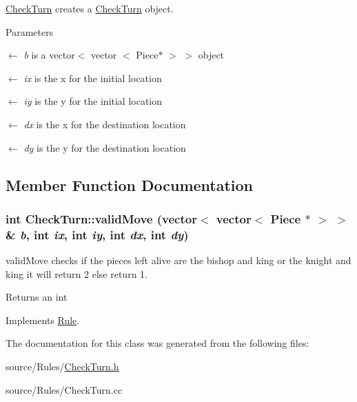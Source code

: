 \hyperlink{classCheckTurn}{CheckTurn} creates a \hyperlink{classCheckTurn}{CheckTurn} object. 
\begin{DoxyParams}{Parameters}
\item[\mbox{$\leftarrow$} {\em b}]is a vector$<$ vector $<$ Piece$\ast$ $>$ $>$ object \item[\mbox{$\leftarrow$} {\em ix}]is the x for the initial location \item[\mbox{$\leftarrow$} {\em iy}]is the y for the initial location \item[\mbox{$\leftarrow$} {\em dx}]is the x for the destination location \item[\mbox{$\leftarrow$} {\em dy}]is the y for the destination location \end{DoxyParams}


\subsection{Member Function Documentation}
\hypertarget{classCheckTurn_acb5d45e0ee242eb4af3dc6a7437b39e5}{
\subsubsection[{validMove}]{\setlength{\rightskip}{0pt plus 5cm}int CheckTurn::validMove (vector$<$ vector$<$ {\bf Piece} $\ast$ $>$ $>$ \& {\em b}, \/  int {\em ix}, \/  int {\em iy}, \/  int {\em dx}, \/  int {\em dy})}}
\label{classCheckTurn_acb5d45e0ee242eb4af3dc6a7437b39e5}


validMove checks if the pieces left alive are the bishop and king or the knight and king it will return 2 else return 1. \begin{DoxyReturn}{Returns}
an int 
\end{DoxyReturn}


Implements \hyperlink{classRule}{Rule}.

The documentation for this class was generated from the following files:\begin{DoxyCompactItemize}
\item 
source/Rules/\hyperlink{CheckTurn_8h}{CheckTurn.h}\item 
source/Rules/CheckTurn.cc\end{DoxyCompactItemize}
